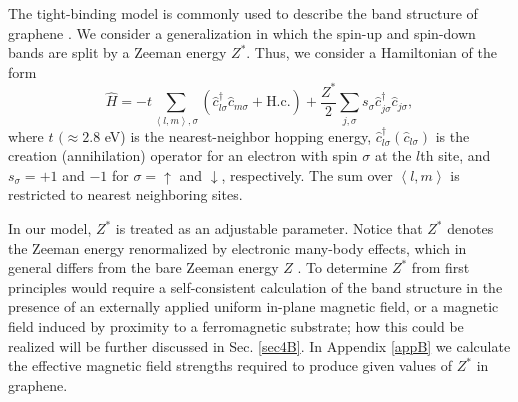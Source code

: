\documentclass[aps,prb,twocolumn,superscriptaddress]{revtex4-2}
\newcommand{\si}{\sigma}
\begin{document}
The tight-binding model is commonly used to describe the band structure of graphene \cite{Neto2009}.
We consider a generalization in which the spin-up and spin-down bands are split by a Zeeman energy $Z^*$.
Thus, we consider a Hamiltonian of the form
\begin{equation}\label{grapheneTB}
\hat H = -t \sum\limits_{\left<l,m\right>,\si} (\hat c_{l\si}^\dagger \hat c_{m\si} + \text{H.c.} ) + \frac{Z^*}{2} \sum\limits_{j,\si} s_\si
\hat c_{j\si}^\dagger \hat c_{j\si} ,
\end{equation}
where $t$ $(\approx 2.8$ eV) is the nearest-neighbor hopping energy, $\hat c_{l\si}^\dagger (\hat c_{l\si})$ is the creation (annihilation) operator for an
electron with spin $\si$ at the $l$th site, and $s_{\si} = +1$ and $-1$ for $\si=\uparrow$ and $\downarrow$, respectively.
The sum over $\left<l,m\right>$ is restricted to nearest neighboring sites.

In our model, $Z^*$ is treated as an adjustable parameter. Notice that $Z^*$ denotes the Zeeman energy renormalized by electronic many-body effects, which in
general differs from the bare Zeeman energy $Z$ \cite{DAmico2019}. To determine $Z^*$ from first principles would require a self-consistent calculation
of the band structure in the presence of an externally applied uniform in-plane magnetic field, or a magnetic field induced by proximity to a ferromagnetic substrate;
how this could be realized will be further discussed in Sec. \ref{sec4B}. In Appendix \ref{appB} we calculate the effective magnetic field strengths
required to produce given values of $Z^*$ in graphene.
\end{document}
